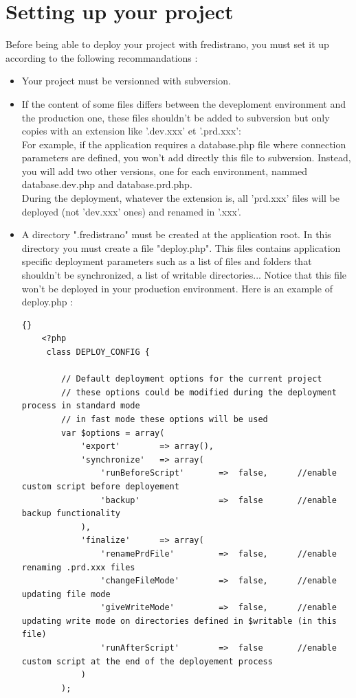 \documentclass[12pt,a4paper]{report}
\begin{document}
\section{Setting up your project}\label{precimportantes}
Before being able to deploy your project with fredistrano, you must set it up according to the following recommandations :\\
\begin{itemize}
\item Your project must be versionned with subversion.\\
\item If the content of some files differs between the deveploment environment and the production one, these files shouldn't be added to subversion but only copies with an extension like '.dev.xxx' et '.prd.xxx':\\
For example, if the application requires a database.php file where connection parameters are defined, you won't add directly this file to subversion. Instead, you will add two other versions, one for each environment, nammed database.dev.php and database.prd.php.\\ 
During the deployment, whatever the extension is, all 'prd.xxx' files will be deployed (not 'dev.xxx' ones) and renamed in '.xxx'.
\item A directory ".fredistrano" must be created at the application root. In this directory you must create a file "deploy.php". This files contains application specific deployment parameters such as a list of files and folders that shouldn't be synchronized, a list of writable directories... Notice that this file won't be deployed in your production environment. Here is an example of deploy.php :\\

\lstset{language=Php}
\lstset{breaklines=true}
\lstset{tabsize=2}
\lstset{commentstyle=\textit}
\begin{lstlisting}[frame=tb]{}
	<?php
	 class DEPLOY_CONFIG {

		// Default deployment options for the current project
		// these options could be modified during the deployment process in standard mode
		// in fast mode these options will be used
	 	var $options = array(
	 		'export' 		=> array(),
	 		'synchronize'	=> array(
	 		 	'runBeforeScript'		=> 	false, 		//enable custom script before deployement 
	 			'backup'				=> 	false 		//enable backup functionality
	 		),
	 		'finalize'		=> array(
		 		'renamePrdFile' 		=> 	false,		//enable renaming .prd.xxx files
				'changeFileMode' 		=> 	false,		//enable updating file mode
				'giveWriteMode'			=> 	false,		//enable updating write mode on directories defined in $writable (in this file)
	 			'runAfterScript'		=> 	false		//enable custom script at the end of the deployement process
	 		)
	 	);


\end{lstlisting}
\end{itemize}
\end{document}
